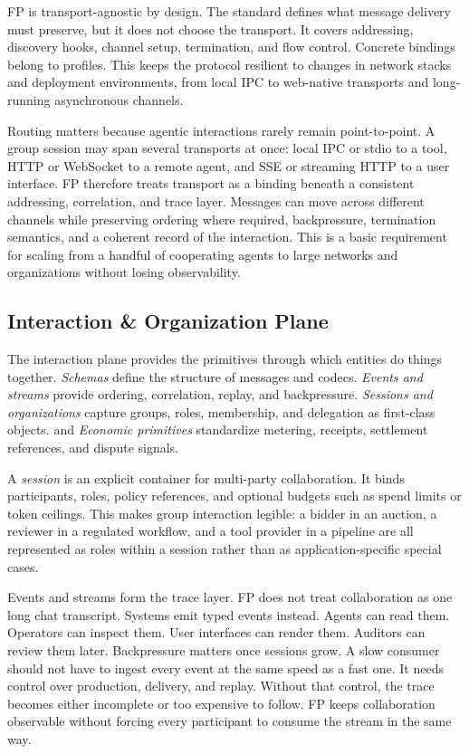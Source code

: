 \documentclass{llmxive}
\begin{document}
FP is transport-agnostic by design. The standard defines what message delivery must preserve, but it does not choose the transport. It covers addressing, discovery hooks, channel setup, termination, and flow control. Concrete bindings belong to profiles. This keeps the protocol resilient to changes in network stacks and deployment environments, from local IPC to web-native transports and long-running asynchronous channels.

Routing matters because agentic interactions rarely remain point-to-point. A group session may span several transports at once: local IPC or stdio to a tool, HTTP or WebSocket to a remote agent, and SSE or streaming HTTP to a user interface. FP therefore treats transport as a binding beneath a consistent addressing, correlation, and trace layer. Messages can move across different channels while preserving ordering where required, backpressure, termination semantics, and a coherent record of the interaction. This is a basic requirement for scaling from a handful of cooperating agents to large networks and organizations without losing observability.


\subsection{Interaction \& Organization Plane}
\label{subsec:interaction}

The interaction plane provides the primitives through which entities do things together. \emph{Schemas} define the structure of messages and codecs. \emph{Events and streams} provide ordering, correlation, replay, and backpressure. \emph{Sessions and organizations} capture groups, roles, membership, and delegation as first-class objects. and \emph{Economic primitives} standardize metering, receipts, settlement references, and dispute signals.

A \emph{session} is an explicit container for multi-party collaboration. It binds participants, roles, policy references, and optional budgets such as spend limits or token ceilings. This makes group interaction legible: a bidder in an auction, a reviewer in a regulated workflow, and a tool provider in a pipeline are all represented as roles within a session rather than as application-specific special cases.

Events and streams form the trace layer. FP does not treat collaboration as one long chat transcript. Systems emit typed events instead. Agents can read them. Operators can inspect them. User interfaces can render them. Auditors can review them later.
Backpressure matters once sessions grow. A slow consumer should not have to ingest every event at the same speed as a fast one. It needs control over production, delivery, and replay. Without that control, the trace becomes either incomplete or too expensive to follow. FP keeps collaboration observable without forcing every participant to consume the stream in the same way.
\end{document}
